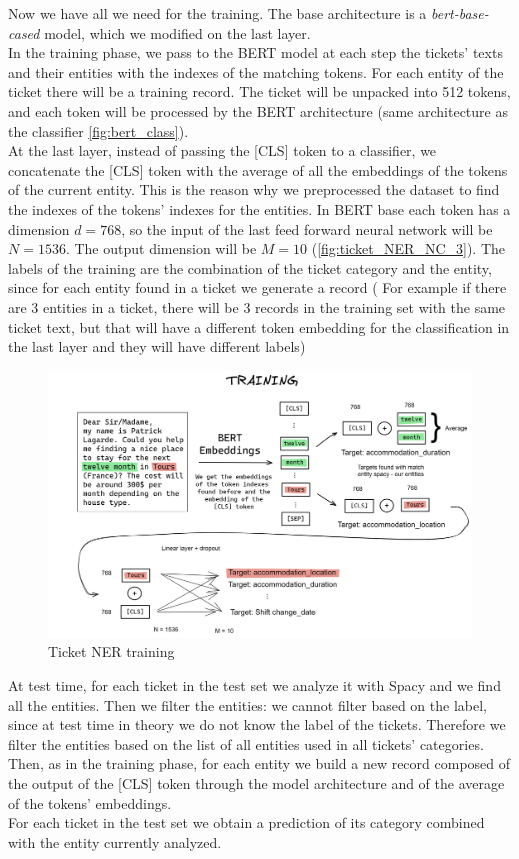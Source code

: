 Now we have all we need for the training. The base architecture is a \textit{bert-base-cased} model, which we modified on the last layer. \\
In the training phase, we pass to the BERT model at each step the tickets' texts and their entities with the indexes of the matching tokens. For each entity of the ticket there will be a training record. The ticket will be unpacked into 512 tokens, and each token will be processed by the BERT architecture (same architecture as the classifier \autoref{fig:bert_class}). \\
At the last layer, instead of passing the [CLS] token to a classifier, we concatenate the [CLS] token with the average of all the embeddings of the tokens of the current entity. This is the reason why we preprocessed the dataset to find the indexes of the tokens' indexes for the entities. In BERT base each token has a dimension $d=768$, so the input of the last feed forward neural network will be $N=1536$. The output dimension will be $M=10$ (\autoref{fig:ticket_NER_NC_3}). The labels of the training are the combination of the ticket category and the entity, since for each entity found in a ticket we generate a record ( For example if there are 3 entities in a ticket, there will be 3 records in the training set with the same ticket text, but that will have a different token embedding for the classification in the last layer and they will have different labels)\\
\begin{figure}[h] 
    \includegraphics[width=\textwidth]{images/NER_nc_3.png}
    \caption{Ticket NER training}
    \label{fig:ticket_NER_NC_3}
\end{figure}
At test time, for each ticket in the test set we analyze it with Spacy and we find all the entities. Then we filter the entities: we cannot filter based on the label, since at test time in theory we do not know the label of the tickets. Therefore we filter the entities based on the list of all entities used in all tickets' categories. \\
Then, as in the training phase, for each entity we build a new record composed of the output of the [CLS] token through the model architecture and of the average of the tokens' embeddings. \\
For each ticket in the test set we obtain a prediction of its category combined with the entity currently analyzed. 
